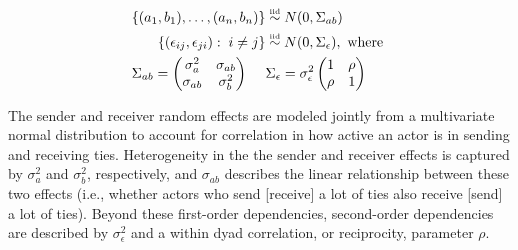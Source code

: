 \begin{align}
	\begin{aligned}
		\{ (a_{1}, b_{1}), \ldots, (a_{n}, b_{n}) \} &\simiid N(0,\Sigma_{ab}) \\ 
		\{ (\epsilon_{ij}, \epsilon_{ji}) : \; i \neq j\} &\simiid N(0,\Sigma_{\epsilon}), \text{ where } \\
		\Sigma_{ab} = \begin{pmatrix} \sigma_{a}^{2} & \sigma_{ab} \\ \sigma_{ab} & \sigma_{b}^2   \end{pmatrix} \;\;\;\;\; &\Sigma_{\epsilon} = \sigma_{\epsilon}^{2} \begin{pmatrix} 1 & \rho \\ \rho & 1  \end{pmatrix}
	\label{eqn:srm}
	\end{aligned}
\end{align}

The sender and receiver random effects are modeled jointly from a multivariate normal distribution to account for correlation in how active an actor is in sending and receiving ties. Heterogeneity in the the sender and receiver effects is captured by $\sigma_{a}^{2}$ and $\sigma_{b}^{2}$, respectively, and $\sigma_{ab}$ describes the linear relationship between these two effects (i.e., whether actors who send [receive] a lot of ties also receive [send] a lot of ties). Beyond these first-order dependencies, second-order dependencies are described by $\sigma_{\epsilon}^{2}$ and a within dyad correlation, or reciprocity, parameter $\rho$.

